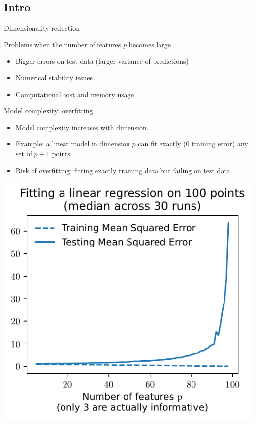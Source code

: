 \documentclass[presentation,mathserif,table]{beamer}
\begin{document}
\subsection{Intro}
\label{sec:org5d6af94}
\begin{frame}[label={sec:orgf8a02ab}]{Dimensionality reduction}
\begin{block}{Problems when the number of features \(p\) becomes large}
\begin{itemize}
\item Bigger errors on test data (larger variance of predictions)
\item Numerical stability issues
\item Computational cost and memory usage
\end{itemize}
\end{block}
\end{frame}
\begin{frame}[label={sec:org0ea6c72}]{Model complexity: overfitting}
\begin{itemize}
\item Model complexity increases with dimension.
\item Example: a linear model in dimension \(p\) can fit exactly (0 training error) any set of \(p + 1\) points.
\item Risk of overfitting: fitting exactly training data but failing on test data
\end{itemize}

\begin{center}
\includegraphics[height=.7\textheight]{figures/generated/ridge_overfitting/mse.pdf}
\end{center}
\end{frame}
\end{document}
